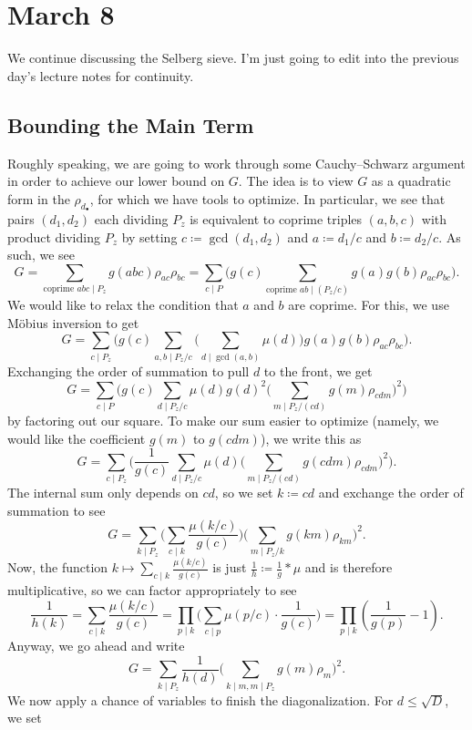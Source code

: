 \documentclass[../notes.tex]{subfiles}
\begin{document}
\section{March 8}

We continue discussing the Selberg sieve. I'm just going to edit into the previous day's lecture notes for continuity.

\subsection{Bounding the Main Term}
Roughly speaking, we are going to work through some Cauchy--Schwarz argument in order to achieve our lower bound on $G$. The idea is to view $G$ as a quadratic form in the $\rho_{d_\bullet}$, for which we have tools to optimize. In particular, we see that pairs $(d_1,d_2)$ each dividing $P_z$ is equivalent to coprime triples $(a,b,c)$ with product dividing $P_z$ by setting $c\coloneqq\gcd(d_1,d_2)$ and $a\coloneqq d_1/c$ and $b\coloneqq d_2/c$. As such, we see
\[G=\sum_{\text{coprime }abc\mid P_z}g(abc)\rho_{ac}\rho_{bc}=\sum_{c\mid P}\Bigg(g(c)\sum_{\text{coprime }ab\mid(P_z/c)}g(a)g(b)\rho_{ac}\rho_{bc}\Bigg).\]
We would like to relax the condition that $a$ and $b$ are coprime. For this, we use M\"obius inversion to get
\[G=\sum_{c\mid P_z}\Bigg(g(c)\sum_{a,b\mid P_z/c}\Bigg(\sum_{d\mid\gcd(a,b)}\mu(d)\Bigg)g(a)g(b)\rho_{ac}\rho_{bc}\Bigg).\]
Exchanging the order of summation to pull $d$ to the front, we get
\[G=\sum_{c\mid P}\Bigg(g(c)\sum_{d\mid P_z/c}\mu(d)g(d)^2\Bigg(\sum_{m\mid P_z/(cd)}g(m)\rho_{cdm}\Bigg)^2\Bigg)\]
by factoring out our square. To make our sum easier to optimize (namely, we would like the coefficient $g(m)$ to $g(cdm)$), we write this as
\[G=\sum_{c\mid P_z}\Bigg(\frac1{g(c)}\sum_{d\mid P_z/c}\mu(d)\Bigg(\sum_{m\mid P_z/(cd)}g(cdm)\rho_{cdm}\Bigg)^2\Bigg).\]
The internal sum only depends on $cd$, so we set $k\coloneqq cd$ and exchange the order of summation to see
\[G=\sum_{k\mid P_z}\Bigg(\sum_{c\mid k}\frac{\mu(k/c)}{g(c)}\Bigg)\Bigg(\sum_{m\mid P_z/k}g(km)\rho_{km}\Bigg)^2.\]
Now, the function $k\mapsto\sum_{c\mid k}\frac{\mu(k/c)}{g(c)}$ is just $\frac1h\coloneqq\frac1g*\mu$ and is therefore multiplicative, so we can factor appropriately to see
\[\frac1{h(k)}=\sum_{c\mid k}\frac{\mu(k/c)}{g(c)}=\prod_{p\mid k}\Bigg(\sum_{c\mid p}\mu(p/c)\cdot\frac1{g(c)}\Bigg)=\prod_{p\mid k}\left(\frac1{g(p)}-1\right).\]
Anyway, we go ahead and write
\[G=\sum_{k\mid P_z}\frac1{h(d)}\Bigg(\sum_{k\mid m,m\mid P_z}g(m)\rho_m\Bigg)^2.\]
We now apply a chance of variables to finish the diagonalization. For $d\le\sqrt D$, we set
\end{document}
